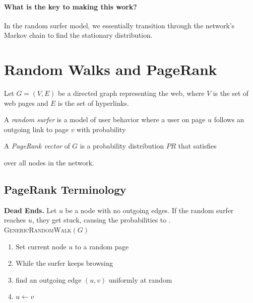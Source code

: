 \documentclass[11pt]{exam}
\begin{document}
	\paragraph{What is the key to making this work?}
	In the random surfer model, we essentially transition through the network's Markov chain to find the stationary distribution.
	
	
	
	\newpage
	\section{Random Walks and PageRank}
Let $G = (V,E)$ be a directed graph representing the web, where $V$ is the set of web pages and $E$ is the set of hyperlinks.


\begin{center}
\end{center}

A \emph{random surfer} is a model of user behavior where a user on page $u$ follows an outgoing link to page $v$ with probability  

\begin{center}
\end{center}

A \emph{PageRank vector} of $G$ is a probability distribution $PR$ that satisfies

\vs{2cm}
over all nodes in the network.

\begin{center}
\end{center}

\newpage
\subsection{PageRank Terminology}
\textbf{Dead Ends.} Let $u$ be a node with no outgoing edges. If the random surfer reaches $u$, they get stuck, causing the probabilities to .\\

\textsc{GenericRandomWalk}$(G)$
\begin{enumerate}
	\item Set current node $u$ to a random page
	\item While the surfer keeps browsing
	\item \;\;\; find an outgoing edge $(u,v)$ uniformly at random
	\item \;\;\; $u \leftarrow v$
\end{enumerate}
\end{document}
